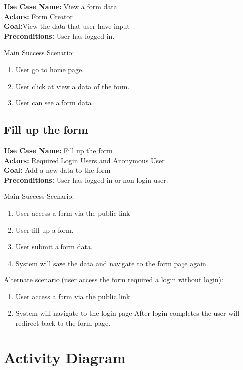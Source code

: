\documentclass[12pt,oneside,openright,a4paper]{cpe-english-project}
\begin{document}
\textbf{Use Case Name:} View a form data \\
\textbf{Actors:} Form Creator\\
\textbf{Goal:}View the data that user have input\\
\textbf{Preconditions:} User has logged in.

Main Success Scenario: 

\begin{enumerate}
    \item User go to home page.
    \item User click at view a data of the form.
    \item User can see a form data
\end{enumerate}

\subsection{Fill up the form}

\textbf{Use Case Name:} Fill up the form \\
\textbf{Actors:} Required Login Users and Anonymous User \\
\textbf{Goal:} Add a new data to the form \\
\textbf{Preconditions:} User has logged in or non-login user.

Main Success Scenario: 

\begin{enumerate}
    \item User access a form via the public link
    \item User fill up a form.
    \item User submit a form data.
    \item System will save the data and navigate to the form page again.
\end{enumerate}

Alternate scenario (user access the form required a login without login):

\begin{enumerate}
    \item User access a form via the public link
    \item System will navigate to the login page After login completes the user will redirect back to the form page.
\end{enumerate}


\section{Activity Diagram}
\end{document}
